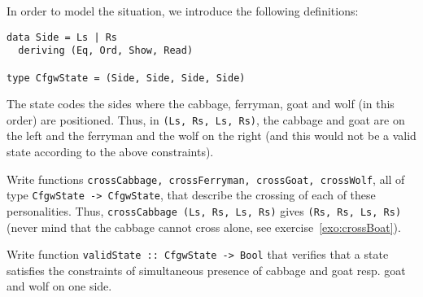 \documentclass[english]{article}
\begin{document}
In order to model the situation, we introduce the following definitions:
\begin{lstlisting}
data Side = Ls | Rs
  deriving (Eq, Ord, Show, Read)

type CfgwState = (Side, Side, Side, Side)
\end{lstlisting}

The state codes the sides where the cabbage, ferryman, goat and wolf (in this
order) are positioned. Thus, in \texttt{(Ls, Rs, Ls, Rs)}, the cabbage and
goat are on the left and the ferryman and the wolf on the right (and this
would not be a valid state according to the above constraints).

\begin{exo}\label{exo:cross}
  Write functions \texttt{crossCabbage, crossFerryman, crossGoat, crossWolf},
  all of type \texttt{CfgwState -> CfgwState}, that describe the crossing of
  each of these personalities. Thus, \texttt{crossCabbage (Ls, Rs, Ls, Rs)}
  gives \texttt{(Rs, Rs, Ls, Rs)} (never mind that the cabbage cannot cross
  alone, see exercise~\ref{exo:crossBoat}).
\end{exo}

\begin{exo}\label{exo:validState}
  Write function \texttt{validState :: CfgwState -> Bool} that verifies that a
  state satisfies the constraints of simultaneous presence of cabbage and goat
  resp. goat and wolf on one side.
\end{exo}
\end{document}
